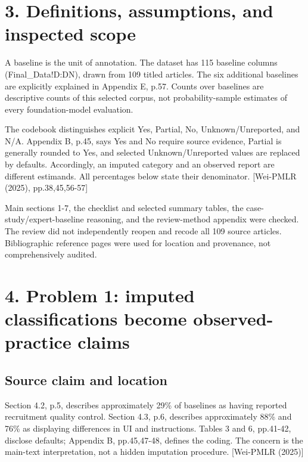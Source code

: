 \documentclass[10pt]{article}
\begin{document}
\section*{3. Definitions, assumptions, and inspected scope}
A baseline is the unit of annotation. The dataset has 115 baseline columns (Final\_Data!D:DN), drawn from 109 titled articles. The six additional baselines are explicitly explained in Appendix E, p.57. Counts over baselines are descriptive counts of this selected corpus, not probability-sample estimates of every foundation-model evaluation.\par
The codebook distinguishes explicit Yes, Partial, No, Unknown/Unreported, and N/A. Appendix B, p.45, says Yes and No require source evidence, Partial is generally rounded to Yes, and selected Unknown/Unreported values are replaced by defaults. Accordingly, an imputed category and an observed report are different estimands. All percentages below state their denominator. [Wei-PMLR (2025), pp.38,45,56-57]\par
Main sections 1-7, the checklist and selected summary tables, the case-study/expert-baseline reasoning, and the review-method appendix were checked. The review did not independently reopen and recode all 109 source articles. Bibliographic reference pages were used for location and provenance, not comprehensively audited.\par
\section*{4. Problem 1: imputed classifications become observed-practice claims}
\subsection*{Source claim and location}
Section 4.2, p.5, describes approximately 29\% of baselines as having reported recruitment quality control. Section 4.3, p.6, describes approximately 88\% and 76\% as displaying differences in UI and instructions. Tables 3 and 6, pp.41-42, disclose defaults; Appendix B, pp.45,47-48, defines the coding. The concern is the main-text interpretation, not a hidden imputation procedure. [Wei-PMLR (2025)]\par
\end{document}
